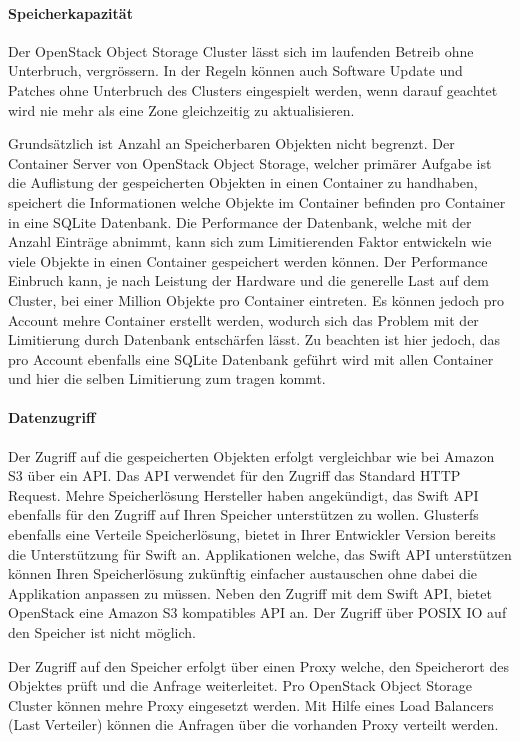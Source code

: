 \paragraph*{Speicherkapazität}
Der OpenStack Object Storage Cluster lässt sich im laufenden Betreib ohne Unterbruch, vergrössern. In der Regeln können auch Software Update und Patches ohne Unterbruch des Clusters eingespielt werden, wenn darauf geachtet wird nie mehr als eine Zone gleichzeitig zu aktualisieren.

Grundsätzlich ist Anzahl an Speicherbaren Objekten nicht begrenzt. Der Container Server von OpenStack Object Storage, welcher primärer Aufgabe ist die Auflistung der gespeicherten Objekten in einen Container zu handhaben, speichert die Informationen welche Objekte im Container befinden pro Container in eine SQLite Datenbank. Die Performance der Datenbank, welche mit der Anzahl Einträge abnimmt, kann sich zum Limitierenden Faktor entwickeln wie viele Objekte in einen Container gespeichert werden können. Der Performance Einbruch kann, je nach Leistung der Hardware und die generelle Last auf dem Cluster, bei einer Million Objekte pro Container eintreten. Es können jedoch pro Account mehre Container erstellt werden, wodurch sich das Problem mit der Limitierung durch Datenbank entschärfen lässt. Zu beachten ist hier jedoch, das pro Account ebenfalls eine SQLite Datenbank geführt wird mit allen Container und hier die selben Limitierung zum tragen kommt.\cite{OpenStack2012}\cite{A2011}

\paragraph*{Datenzugriff}
Der Zugriff auf die gespeicherten Objekten erfolgt vergleichbar wie bei Amazon S3 über ein API. Das API verwendet für den Zugriff das Standard HTTP Request. Mehre Speicherlösung Hersteller haben angekündigt, das Swift API ebenfalls für den Zugriff auf Ihren Speicher unterstützen zu wollen. Glusterfs ebenfalls eine Verteile Speicherlösung, bietet in Ihrer Entwickler Version bereits die Unterstützung für Swift an. Applikationen welche, das Swift API unterstützen können Ihren Speicherlösung zukünftig einfacher austauschen ohne dabei die Applikation anpassen zu müssen. Neben den Zugriff mit dem Swift API, bietet OpenStack eine Amazon S3 kompatibles API an. Der Zugriff über POSIX IO auf den Speicher ist nicht möglich.

Der Zugriff auf den Speicher erfolgt über einen Proxy welche, den Speicherort des Objektes prüft und die Anfrage weiterleitet. Pro OpenStack Object Storage Cluster können mehre Proxy eingesetzt werden. Mit Hilfe eines Load Balancers (Last Verteiler) können die Anfragen über die vorhanden Proxy verteilt werden.

